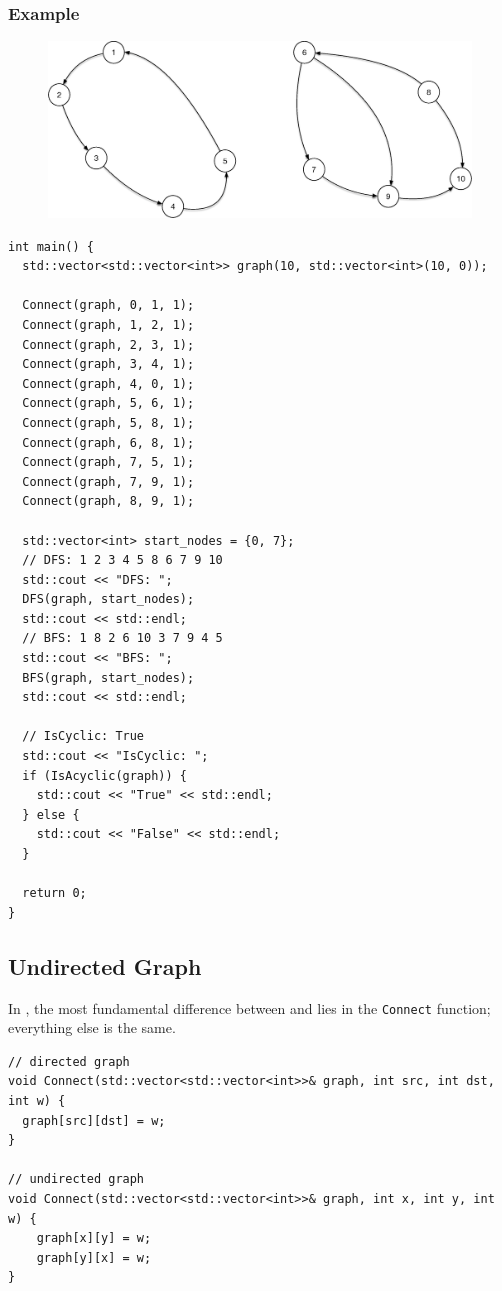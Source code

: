 \subsubsection{Example}
\begin{figure}[H]
\centering
\includegraphics[width=0.7\linewidth]{images/directed_graph_eg}
\end{figure}

\begin{lstlisting}
int main() {
  std::vector<std::vector<int>> graph(10, std::vector<int>(10, 0));

  Connect(graph, 0, 1, 1);
  Connect(graph, 1, 2, 1);
  Connect(graph, 2, 3, 1);
  Connect(graph, 3, 4, 1);
  Connect(graph, 4, 0, 1);
  Connect(graph, 5, 6, 1);
  Connect(graph, 5, 8, 1);
  Connect(graph, 6, 8, 1);
  Connect(graph, 7, 5, 1);
  Connect(graph, 7, 9, 1);
  Connect(graph, 8, 9, 1);

  std::vector<int> start_nodes = {0, 7};
  // DFS: 1 2 3 4 5 8 6 7 9 10
  std::cout << "DFS: ";
  DFS(graph, start_nodes);
  std::cout << std::endl;
  // BFS: 1 8 2 6 10 3 7 9 4 5
  std::cout << "BFS: ";
  BFS(graph, start_nodes);
  std::cout << std::endl;

  // IsCyclic: True
  std::cout << "IsCyclic: ";
  if (IsAcyclic(graph)) {
    std::cout << "True" << std::endl;
  } else {
    std::cout << "False" << std::endl;
  }

  return 0;
}
\end{lstlisting}

\subsection{Undirected Graph}
In {\color{blue}{adjacency matrix}}, the most fundamental difference between {\color{blue}{undirected graph}} and {\color{blue}{directed graph}} lies in the {\colorbox{CodeBackground}{\lstinline|Connect|}} function; everything else is the same.
\begin{lstlisting}
// directed graph
void Connect(std::vector<std::vector<int>>& graph, int src, int dst, int w) {
  graph[src][dst] = w;
}

// undirected graph
void Connect(std::vector<std::vector<int>>& graph, int x, int y, int w) {
	graph[x][y] = w;
	graph[y][x] = w;
}
\end{lstlisting}
